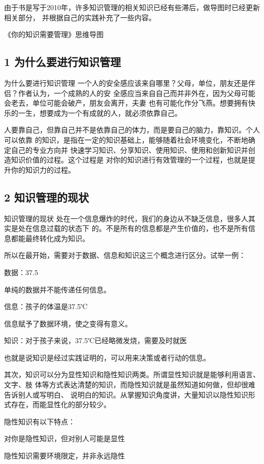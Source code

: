 \documentclass[11pt]{ctexart}
\begin{document}
{{{{由于书是写于2010年，许多知识管理的相关知识已经有些滞后，做导图时已经更新相关部分，
并根据自己的实践补充了一些内容。


《你的知识需要管理》思维导图
\subsection{1 为什么要进行知识管理}
\label{sec:orgafee285}

为什么要进行知识管理
一个人的安全感应该来自哪里？父母，单位，朋友还是伴侣？作者认为，一个成熟的人的安
全感应当来自自己而并非外在，因为父母可能会老去，单位可能会破产，朋友会离开，夫妻
也有可能化作分飞燕。想要拥有快乐的一生，想要成为一个有成就的人，就必须依靠自己。

人要靠自己，但靠自己并不是依靠自己的体力，而是要自己的脑力，靠知识。个人可以依靠
的知识，是指在一定的知识基础上，能够随着社会环境变化，不断地确定自己的专业方向并
快速学习知识、分享知识、使用知识、使用和创新知识并创造知识价值的过程。这个过程是
对你的知识进行有效管理的一个过程，也就是提升你的知识力的过程。

\subsection{2 知识管理的现状}
\label{sec:orgd487da6}

知识管理的现状
处在一个信息爆炸的时代，我们的身边从不缺乏信息，很多人其实是处在信息过载的状态下
的。不是所有的信息都是产生价值的，也不是所有信息都能最终转化成为知识。

所以在最开始，需要对于数据、信息和知识这三个概念进行区分。试举一例：

数据：37.5

单纯的数据并不能传递任何信息。

信息：孩子的体温是37.5℃

信息赋予了数据环境，使之变得有意义。

知识：对于孩子来说，37.5℃已经略微发烧，需要及时就医

也就是说知识是经过实践证明的，可以用来决策或者行动的信息。

其次，知识可以分为显性知识和隐性知识两类。所谓显性知识就是能够利用语言、文字、肢
体等方式表达清楚的知识，而隐性知识就是虽然知道如何做，但却很难告诉别人或写明白、
说明白的知识。从掌握知识角度讲，大量知识以隐性知识形式存在，而能显性化的部分较少。

隐性知识有以下特点：

对你是隐性知识，但对别人可能是显性

隐性知识需要环境限定，并非永远隐性

}}}}
\end{document}
